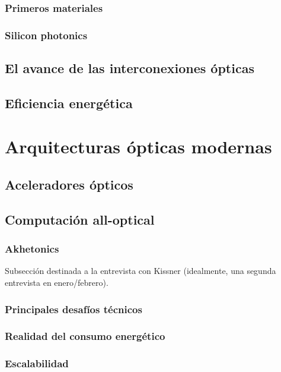 \documentclass[12pt,a4paper]{report}
\begin{document}
\subsection{Primeros materiales}

\subsection{Silicon photonics}

\section{El avance de las interconexiones ópticas}

\section{Eficiencia energética}

\chapter{Arquitecturas ópticas modernas}

\section{Aceleradores ópticos}

\section{Computación all-optical}

\subsection{Akhetonics}

Subsección destinada a la entrevista con Kissner (idealmente, una segunda entrevista en enero/febrero).

\subsection{Principales desafíos técnicos}

\subsection{Realidad del consumo energético}

\subsection{Escalabilidad}
\end{document}
